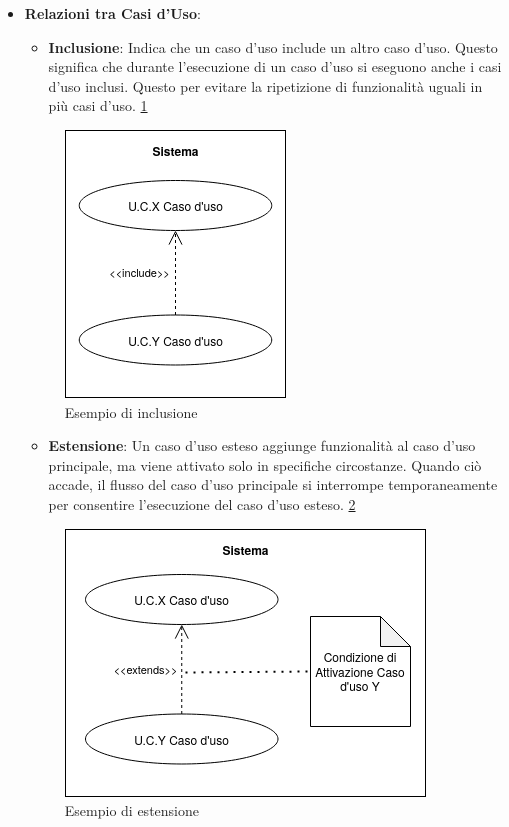\begin{itemize}
    \item \textbf{Relazioni tra Casi d’Uso}:
    \begin{itemize}
        \item \textbf{Inclusione}: Indica che un caso d’uso include un altro caso d’uso. Questo significa che durante l'esecuzione di un caso d'uso si eseguono anche i casi d'uso inclusi. Questo per evitare la ripetizione di funzionalità uguali in più casi d'uso. \ref{fig:inclusione}
    \end{itemize}
    

    \begin{figure}[H]
        \centering
        \includegraphics{../../../img/include.png}
        \caption{Esempio di inclusione}
        \label{fig:inclusione}
    \end{figure}

    
    \begin{itemize}
        \item \textbf{Estensione}: Un caso d'uso esteso aggiunge funzionalità al caso d'uso principale, ma viene attivato solo in specifiche circostanze. Quando ciò accade, il flusso del caso d'uso principale si interrompe temporaneamente per consentire l'esecuzione del caso d'uso esteso. \ref{fig:estensione}
    \end{itemize}

    \begin{figure}[H]
        \centering
        \includegraphics{../../../img/estensione.png}
        \caption{Esempio di estensione}
        \label{fig:estensione}
    \end{figure}
    

\end{itemize}
